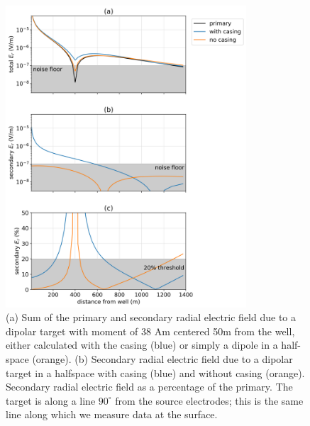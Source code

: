 \begin{figure}
    \begin{center}
    \includegraphics[width=0.8\textwidth]{figures/dc_casing/detectability_dipole.png}
    \end{center}
\caption{
    (a) Sum of the primary and secondary radial electric field due to a dipolar
    target with moment of 38 Am
    centered 50m from the well, either calculated with the
    casing (blue) or simply a dipole in a half-space (orange). (b) Secondary
    radial electric field due to a dipolar target in a halfspace with casing (blue) and without casing (orange).
    Secondary radial electric field as a percentage of the primary.
    The target is along a line $90^\circ$ from the
    source electrodes; this is the same line along which we measure data at the surface.
}
\label{fig:detectability_dipole}
\end{figure}

